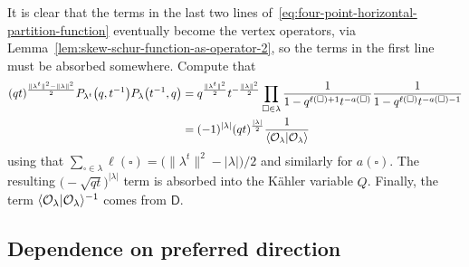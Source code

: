 \documentclass[pdftex]{sigma}%
\numberwithin{equation}{section}
\newcommand{\cO}{\mathcal{O}}
\newcommand{\sD}{\mathsf{D}}
\DeclarePairedDelimiter{\inner}{\langle}{\rangle}
\begin{document}
\begin{MyParagraph}
It is clear that the terms in the last two lines of~\eqref{eq:four-point-horizontal-partition-function} eventually become
the vertex operators, via Lemma~\ref{lem:skew-schur-function-as-operator-2}, so the terms in the
first line must be absorbed somewhere. Compute that
 \begin{align}
 (qt)^{\frac{\|\lambda^t\|^2 - \|\lambda\|^2}{2}} P_{\lambda^t}\big(q,t^{-1}\big) P_{\lambda}\big(t^{-1},q\big)
 &= q^{\frac{\|\lambda^t\|^2}{2}}t^{-\frac{\|\lambda\|^2}{2}} \prod_{\square \in \lambda} \frac{1}{1 - q^{\ell(\square)+1} t^{-a(\square)}} \frac{1}{1 - q^{\ell(\square)} t^{-a(\square)-1}} \nonumber\\
 &= (-1)^{|\lambda|} (qt)^{\frac{|\lambda|}{2}} \frac{1}{\inner{\cO_\lambda | \cO_\lambda}} \label{eq:four-point-macdonald-factors}
 \end{align}
using that $\sum_{\square \in \lambda} \ell(\square) = \big(\|\lambda^t\|^2
- |\lambda|\big)/2$ and similarly for $a(\square)$. The resulting
$\big({-}\sqrt{qt}\big)^{|\lambda|}$ term is absorbed into the K\"ahler variable
$Q$. Finally, the term $\inner{\cO_\lambda | \cO_\lambda}^{-1}$ comes
from $\sD$.
\end{MyParagraph}

\subsection{Dependence on preferred direction}\label{sec:dependence-on-preferred-direction}
\end{document}
